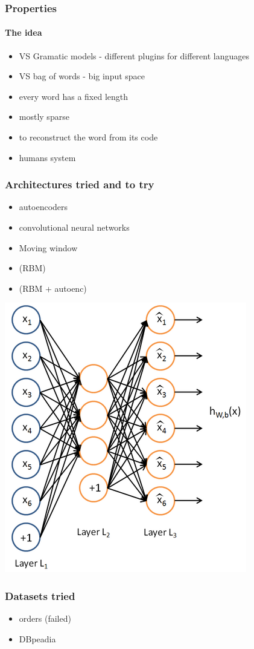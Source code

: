 \documentclass[compress,red]{beamer}
\begin{document}
\begin{frame}\frametitle{Properties}
\framesubtitle{The idea}

\begin{itemize}
\item VS Gramatic models - different plugins for different languages
\item VS bag of words - big input space
\item every word has a fixed length
\item mostly sparse 
\item to reconstruct the word from its code
\item humans system
\end{itemize}
\end{frame}

%
%
%
\begin{frame}\frametitle{Architectures tried and to try}

\begin{itemize}
\item autoencoders
\item convolutional neural networks
\item Moving window
\item (RBM)
\item (RBM + autoenc)
\end{itemize}

\begin{center}
\includegraphics[width=0.3\columnwidth]{400px-Autoencoder636.png}
\end{center}


\end{frame}

%
% 
%
%
\begin{frame}[fragile]\frametitle{Datasets tried}
\begin{itemize}
\item orders (failed)
\item DBpeadia
\end{itemize}
\end{frame}
\end{document}
